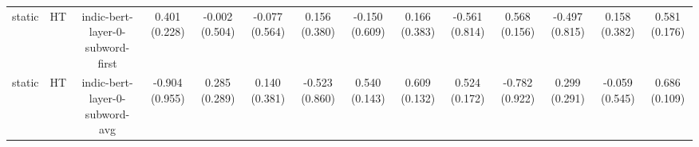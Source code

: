 \begin{sidewaystable}[htb]
\begin{tabular}{@{}cccccccccccccc@{}}
        static & HT & indic-bert-layer-0-subword-first & 0.401 (0.228) & -0.002 (0.504) & -0.077 (0.564) & 0.156 (0.380) & -0.150 (0.609) & 0.166 (0.383) & -0.561 (0.814) & 0.568 (0.156) & -0.497 (0.815) & 0.158 (0.382) & 0.581 (0.176) \\
        static & HT & indic-bert-layer-0-subword-avg & -0.904 (0.955) & 0.285 (0.289) & 0.140 (0.381) & -0.523 (0.860) & 0.540 (0.143) & 0.609 (0.132) & 0.524 (0.172) & -0.782 (0.922) & 0.299 (0.291) & -0.059 (0.545) & 0.686 (0.109) \\
        \bottomrule
    \end{tabular}
\end{sidewaystable}